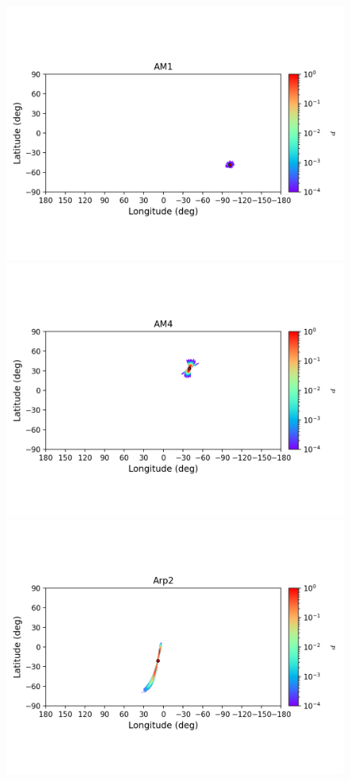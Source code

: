 \begin{figure}
\begin{center}
                \includegraphics[clip=true, trim = 0mm 20mm 0mm 10mm, width=1\columnwidth]{images/error_plots_AM1.png}
                \includegraphics[clip=true, trim = 0mm 20mm 0mm 10mm, width=1\columnwidth]{images/error_plots_AM4.png}
                \includegraphics[clip=true, trim = 0mm 20mm 0mm 10mm, width=1\columnwidth]{images/error_plots_Arp2.png}

\end{center}
\end{figure}
